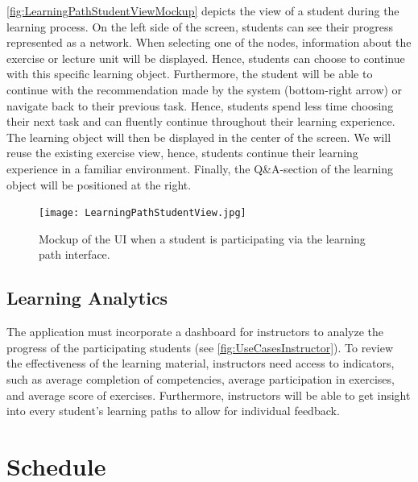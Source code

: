 \documentclass[a4paper,12pt,twoside]{article}
\begin{document}
\autoref{fig:LearningPathStudentViewMockup} depicts the view of a student during the learning process. On the left side of the screen, students can see their
progress represented as a network. When selecting one of the nodes, information about the exercise or lecture unit will be displayed. Hence, students can choose
to continue with this specific learning object. Furthermore, the student will be able to continue with the recommendation made by the system (bottom-right arrow)
or navigate back to their previous task. Hence, students spend less time choosing their next task and can fluently
continue throughout their learning experience.
The learning object will then be displayed in the center of the screen. We will reuse the existing exercise view, hence, students continue their learning experience in
a familiar environment. Finally, the Q\&A-section of the learning object will be positioned at the right.

\begin{figure}[h!]
        \centering
        \texttt{[image: LearningPathStudentView.jpg]}
        \caption{Mockup of the UI when a student is participating via the learning path interface.}
        \label{fig:LearningPathStudentViewMockup}
\end{figure}

\subsection{Learning Analytics}
The application must incorporate a dashboard for instructors to analyze the progress of the participating students
(see \autoref{fig:UseCasesInstructor}). To review the effectiveness of the learning material, instructors need access
to indicators, such as average completion of competencies, average participation in exercises, and average score of exercises.
Furthermore, instructors will be able to get insight into every student's learning paths to allow for individual feedback.


\section{Schedule}
\end{document}
